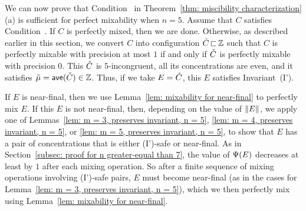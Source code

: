 We can now prove that Condition~{\MixCond} in 
Theorem~\ref{thm: miscibility characterization}(a) is sufficient 
for perfect mixability when $n=5$.
Assume that $C$ satisfies Condition~{\MixCond}. 
If $C$ is perfectly mixed, then we are done.
Otherwise, as described earlier in this section, 
we convert $C$ into configuration ${\check{C}}{\,\sqsubset\,}{\mathbb Z}$
such that $C$ is perfectly mixable with precision at most $1$ if and only if
${\check{C}}$ is perfectly mixable with precision $0$.
This ${\check{C}}$ is $5$-incongruent, all its concentrations are even, and
it satisfies ${\check{\mu}} = {\textsf{ave}}({\check{C}})\in{\mathbb Z}$.
Thus, if we take $E  = {\check{C}}$, this $E$ satisfies Invariant~(I').


If $E$ is near-final, then we use Lemma~\ref{lem: mixability for near-final}
to perfectly mix $E$.
If this $E$ is not near-final, then, depending on the value of ${\|E\|}$, 
we apply one of Lemmas~\ref{lem: m = 3, preserves invariant, n = 5}, 
\ref{lem: m = 4, preserves invariant, n = 5},
or \ref{lem: m = 5, preserves invariant, n = 5}, 
to show that $E$ has a pair of concentrations that is either (I')-safe or near-final.
As in Section~\ref{subsec: proof for n greater-equal than 7},
the value of ${\Psi}(E)$ decreases at least by $1$ after each mixing operation.
So after a finite sequence of mixing operations involving (I')-safe pairs,
$E$ must become near-final (as in the cases for Lemma~\ref{lem: m = 3, preserves invariant, n = 5}), 
which we then perfectly mix using Lemma~\ref{lem: mixability for near-final}.


